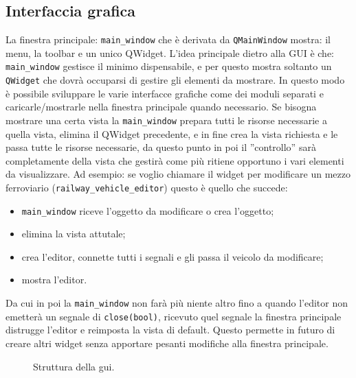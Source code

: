 \documentclass[a4paper,10pt]{article}
\begin{document}
\subsection {Interfaccia grafica}
La finestra principale: \texttt{main\_window} che è derivata da \texttt{QMainWindow} mostra: il menu, la toolbar e un unico QWidget. L'idea principale dietro alla GUI è che: \texttt{main\_window} gestisce il minimo dispensabile, e per questo mostra soltanto un \texttt{QWidget} che dovrà occuparsi di gestire gli elementi da mostrare. In questo modo è possibile sviluppare le varie interfacce grafiche come dei moduli separati e caricarle/mostrarle nella finestra principale quando necessario. Se bisogna mostrare una certa vista la \texttt{main\_window} prepara tutti le risorse necessarie a quella vista, elimina il QWidget precedente, e in fine crea la vista richiesta e le passa tutte le risorse necessarie, da questo punto in poi il ''controllo'' sarà completamente della vista che gestirà come più ritiene opportuno i vari elementi da visualizzare. Ad esempio: se voglio chiamare il widget per modificare un mezzo ferroviario (\texttt{railway\_vehicle\_editor}) questo è quello che succede:
\begin{itemize}
\item \texttt{main\_window} riceve l'oggetto da modificare o crea l'oggetto;
\item elimina la vista attutale;
\item crea l'editor, connette tutti i segnali e gli passa il veicolo da modificare;
\item mostra l'editor.
\end{itemize}
Da cui in poi la \texttt{main\_window} non farà più niente altro fino a quando l'editor non emetterà un segnale di \texttt{close(bool)}, ricevuto quel segnale la finestra principale distrugge l'editor e reimposta la vista di default. Questo permette in futuro di creare altri widget senza apportare pesanti modifiche alla finestra principale.
\newline
\begin{figure}[htp]
\centering

\caption{Struttura della gui.}
\end{figure}
\end{document}
